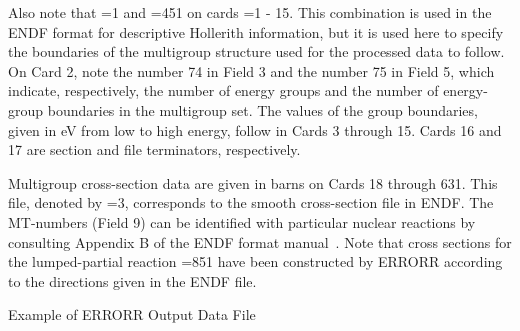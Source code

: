 Also note that =1 and =451 on cards =1 -
15.  This  combination is used in the ENDF
format for descriptive Hollerith information, but it is used here to
specify the boundaries of the multigroup structure used for the
processed data to follow.  On Card 2, note the number 74 in Field 3 and
the number 75 in Field 5, which indicate, respectively, the number of
energy groups and the number of energy-group boundaries in the
multigroup set.  The values of the group boundaries, given in eV from
low to high energy, follow in Cards 3 through 15.  Cards 16 and 17 are
section and file terminators, respectively.

Multigroup cross-section data are given in barns on Cards 18
through 631.  This file, denoted by =3, corresponds to the
smooth cross-section file in ENDF.  The MT-numbers (Field 9) can be
identified with particular nuclear reactions by consulting Appendix B
of the ENDF format manual~\cite{ENDF102}.  Note that cross sections
for the lumped-partial reaction =851 have been constructed by
ERRORR according to the directions given in the ENDF file.

\begin{center}
Example of ERRORR Output Data File
\end{center}


